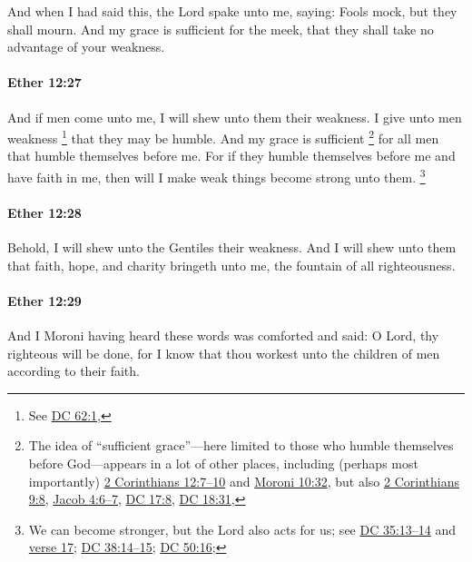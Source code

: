 			And when I had said this,
			the Lord spake unto me, saying:
			Fools mock, but they shall mourn.
			And my grace is sufficient for the meek,
			that they shall take no advantage of your weakness.

		\paragraph{Ether 12:27} %
			\label{ETHER-12-27}

			And if men come unto me, I will shew unto them their weakness.
			I give unto men weakness%
				\footnote{%
					See \hyperref[DC62-1]{DC 62:1}, 
					}
			that they may be humble.
			And my grace is sufficient%
				\footnote{%
					The idea of ``sufficient grace''---here limited to those who humble themselves before God---appears in a lot of other places, including (perhaps most importantly) \hyperref[2CORINTHIANS-12-7]{2 Corinthians 12:7--10} and \hyperref[MORONI-10-32]{Moroni 10:32}, but also \hyperref[2CORINTHIANS-9-8]{2 Corinthians 9:8}, \hyperref[JACOB-4-6]{Jacob 4:6--7}, \hyperref[DC17-8]{DC 17:8}, \hyperref[DC18-31]{DC 18:31}, 
					}
			for all men that humble themselves before me.
			For if they humble themselves before me and have faith in me,
			then will I make weak things become strong unto them.%
				\footnote{%
					We can become stronger, but the Lord also acts for us; see \hyperref[DC35-13]{DC 35:13--14} and \hyperref[DC35-17]{verse 17}; \hyperref[DC38-14]{DC 38:14--15}; \hyperref[DC50-16]{DC 50:16}; 
					}

		\paragraph{Ether 12:28} %
			\label{ETHER-12-28}

			Behold, I will shew unto the Gentiles their weakness.
			And I will shew unto them
			that faith, hope, and charity bringeth unto me,
			the fountain of all righteousness.

		\paragraph{Ether 12:29} %
			\label{ETHER-12-29}

			And I Moroni having heard these words was comforted and said:
			O Lord, thy righteous will be done,
			for I know that thou workest unto the children of men according to their faith.

